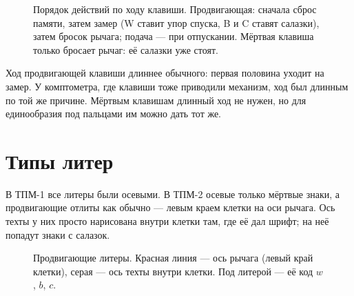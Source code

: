 \begin{figure}[h]
\centering
{}
\caption{Порядок действий по ходу клавиши. Продвигающая: сначала сброс памяти, затем замер (W ставит упор спуска, B и C ставят салазки), затем бросок рычага; подача — при отпускании. Мёртвая клавиша только бросает рычаг: её салазки уже стоят.}
\label{fig:stroke}
\end{figure}

Ход продвигающей клавиши длиннее обычного: первая половина уходит на замер. У комптометра, где клавиши тоже приводили механизм, ход был длинным по той же причине. Мёртвым клавишам длинный ход не нужен, но для единообразия под пальцами им можно дать тот же.

\section{Типы литер}

В ТПМ-1 все литеры были осевыми. В ТПМ-2 осевые только мёртвые знаки, а продвигающие отлиты как обычно — левым краем клетки на оси рычага. Ось техты у них просто нарисована внутри клетки там, где её дал шрифт; на неё попадут знаки с салазок.

\begin{figure}[h]
\centering
\setlength\tgem{26mm}
\begin{tikzpicture}[x=\tgu,y=\tgu]

\end{tikzpicture}
\caption{Продвигающие литеры. Красная линия — ось рычага (левый край клетки), серая — ось техты внутри клетки. Под литерой — её код $w$, $b$, $c$.}
\end{figure}

